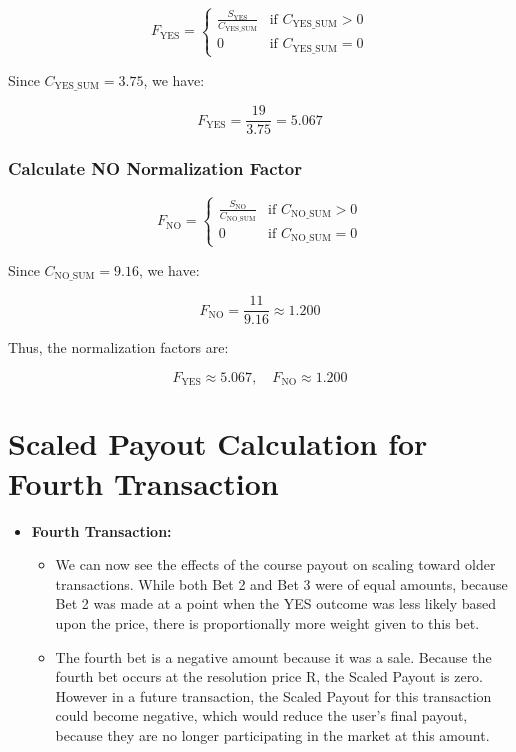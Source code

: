 \documentclass{article}
\begin{document}
\[
F_{\text{YES}} =
\begin{cases}
      \frac{S_{\text{YES}}}{C_{\text{YES\_SUM}}} & \text{if } C_{\text{YES\_SUM}} > 0 \\
      0 & \text{if } C_{\text{YES\_SUM}} = 0
   \end{cases}
\]

Since \( C_{\text{YES\_SUM}} = 3.75 \), we have:

\[
F_{\text{YES}} = \frac{19}{3.75} = 5.067
\]

\subsubsection*{Calculate NO Normalization Factor}

\[
F_{\text{NO}} =
\begin{cases}
      \frac{S_{\text{NO}}}{C_{\text{NO\_SUM}}} & \text{if } C_{\text{NO\_SUM}} > 0 \\
      0 & \text{if } C_{\text{NO\_SUM}} = 0
   \end{cases}
\]

Since \( C_{\text{NO\_SUM}} = 9.16 \), we have:

\[
F_{\text{NO}} = \frac{11}{9.16} \approx 1.200
\]

Thus, the normalization factors are:

\[
F_{\text{YES}} \approx 5.067, \quad F_{\text{NO}} \approx 1.200
\]


\section*{Scaled Payout Calculation for Fourth Transaction}

\begin{itemize}
    \item \textbf{Fourth Transaction:}
    \begin{itemize}
        \item We can now see the effects of the course payout on scaling toward older transactions. While both Bet 2 and Bet 3 were of equal amounts, because Bet 2 was made at a point when the YES outcome was less likely based upon the price, there is proportionally more weight given to this bet.
        \item The fourth bet is a negative amount because it was a sale. Because the fourth bet occurs at the resolution price R, the Scaled Payout is zero. However in a future transaction, the Scaled Payout for this transaction could become negative, which would reduce the user's final payout, because they are no longer participating in the market at this amount.
    \end{itemize}
\end{itemize}
\end{document}
